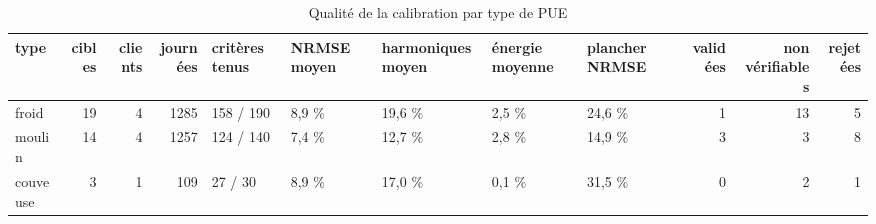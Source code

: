 \begin{table}[htbp]
\caption{Qualité de la calibration par type de PUE}
\label{tab:type_qualite}
\begin{tabular}{lrrrlllllrrr}
\toprule
type & cibles & clients & journées & critères tenus & NRMSE moyen & harmoniques moyen & énergie moyenne & plancher NRMSE & validées & non vérifiables & rejetées \\
\midrule
froid & 19 & 4 & 1285 & 158 / 190 & 8,9 \% & 19,6 \% & 2,5 \% & 24,6 \% & 1 & 13 & 5 \\
moulin & 14 & 4 & 1257 & 124 / 140 & 7,4 \% & 12,7 \% & 2,8 \% & 14,9 \% & 3 & 3 & 8 \\
couveuse & 3 & 1 & 109 & 27 / 30 & 8,9 \% & 17,0 \% & 0,1 \% & 31,5 \% & 0 & 2 & 1 \\
\bottomrule
\end{tabular}
\end{table}
